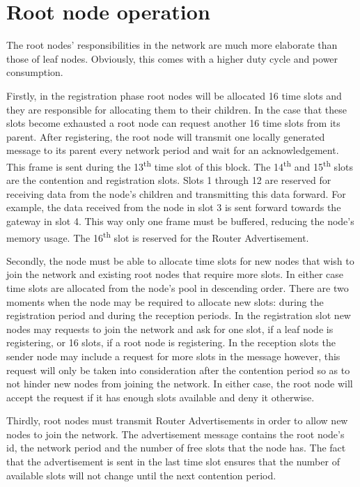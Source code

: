 \section{Root node operation}
\label{sec:root_node_operation}

The root nodes' responsibilities in the network are much more elaborate than
those of leaf nodes. Obviously, this comes with a higher duty cycle and power
consumption. 

Firstly, in the registration phase root nodes will be allocated 16 time slots
and they are responsible for allocating them to their children. In the case
that these slots become exhausted a root node can request another 16 time slots
from its parent. After registering, the root node will transmit one locally
generated message to its parent every network period and wait for an
acknowledgement.  This frame is sent during the 13\textsuperscript{th} time
slot of this block.  The 14\textsuperscript{th} and 15\textsuperscript{th}
slots are the contention and registration slots. Slots 1 through 12 are
reserved for receiving data from the node's children and transmitting this data
forward. For example, the data received from the node in slot 3 is sent forward
towards the gateway in slot 4.  This way only one frame must be buffered,
reducing the node's memory usage. The 16\textsuperscript{th} slot is reserved
for the Router Advertisement.

Secondly, the node must be able to allocate time slots for new nodes that wish
to join the network and existing root nodes that require more slots. In either
case time slots are allocated from the node's pool in descending order. There
are two moments when the node may be required to allocate new slots: during the
registration period and during the reception periods. In the registration slot
new nodes may requests to join the network and ask for one slot, if a leaf node
is registering, or 16 slots, if a root node is registering. In the reception
slots the sender node may include a request for more slots in the message
however, this request will only be taken into consideration after the
contention period so as to not hinder new nodes from joining the network. In
either case, the root node will accept the request if it has enough slots
available and deny it otherwise.  

Thirdly, root nodes must transmit Router Advertisements in order to allow new
nodes to join the network. The advertisement message contains the root node's
id, the network period and the number of free slots that the node has. The fact
that the advertisement is sent in the last time slot ensures that the number of
available slots will not change until the next contention period.

